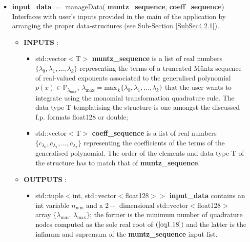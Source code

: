 \documentclass[a4paper, twosided]{book}
\begin{document}
\begin{itemize}
    \item \color{poliDarkBlue} \textbf{input\_data} \color{black} $=$ \colorbox{poliGrayBlue}{manageData}(\color{poliDarkBlue} \textbf{muntz\_sequence}\color{black}, \color{poliDarkBlue} \textbf{coeff\_sequence}\color{black})
    \newline Interfaces with user's inputs provided in the \colorbox{poliGrayBlue}{main} of the application by arranging the proper data-structures (see Sub-Section \ref{SubSec4.2.1}).
    \begin{itemize}
        \item \color{poliDarkBlue} \textbf{INPUTS} \color{black}:
        \begin{itemize}
            \item \colorbox{poliGrayBlue}{std::vector$<$T$>$} \color{poliDarkBlue} \textbf{muntz\_sequence} \color{black} is a list of real numbers $\{\lambda_0, \lambda_1, \dots, \lambda_k\}$ representing the terms of a truncated Müntz sequence of real-valued exponents associated to the generalised polynomial $p(x)\in\mathbb{P}_{\lambda_{\text{max}}},\:\lambda_{\text{max}}=\text{max}_{\,k}\{\lambda_0, \lambda_1, \dots, \lambda_k\}$ that the user wants to integrate using the monomial transformation quadrature rule. The data type \colorbox{poliGrayBlue}{T} templatising the structure is one amongst the discussed f.p. formats \colorbox{poliGrayBlue}{float128} or \colorbox{poliGrayBlue}{double};
            \item \colorbox{poliGrayBlue}{std::vector$<$T$>$} \color{poliDarkBlue} \textbf{coeff\_sequence} \color{black} is a list of real numbers $\{c_{\lambda_0}, c_{\lambda_1}, \dots, c_{\lambda_k}\}$ representing the coefficients of the terms of the generalised polynomial. The order of the elements and data type \colorbox{poliGrayBlue}{T} of the structure has to match that of \color{poliDarkBlue} \textbf{muntz\_sequence}\color{black}.
        \end{itemize}
        \item \color{poliDarkBlue} \textbf{OUTPUTS} \color{black}:
        \begin{itemize}
            \item \colorbox{poliGrayBlue}{std::tuple$<$int, std::vector$<$float128$>>$} \color{poliDarkBlue} \textbf{input\_data} \color{black} contains an \colorbox{poliGrayBlue}{int} variable $n_{\text{min}}$ and a $2-$ dimensional \colorbox{poliGrayBlue}{std::vector$<$float128$>$} array $\{\lambda_{\text{min}}, \,\lambda_{\text{max}}\}$; the former is the minimum number of quadrature nodes computed as the sole real root of $(\ref{eq1.18})$ and the latter is the infimum and supremum of the \color{poliDarkBlue} \textbf{muntz\_sequence} \color{black} input list.
        \end{itemize}
    \end{itemize}
    

\end{itemize}
\end{document}
